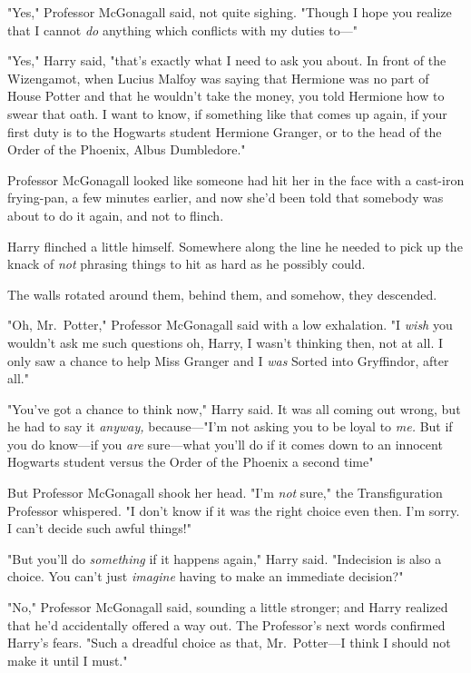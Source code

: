 "Yes," Professor McGonagall said, not quite sighing. "Though I hope you realize
that I cannot \emph{do} anything which conflicts with my duties to---"

"Yes," Harry said, "that's exactly what I need to ask you about. In front of
the Wizengamot, when Lucius Malfoy was saying that Hermione was no part of
House Potter and that he wouldn't take the money, you told Hermione how to
swear that oath. I want to know, if something like that comes up again, if your
first duty is to the Hogwarts student Hermione Granger, or to the head of the
Order of the Phoenix, Albus Dumbledore."

Professor McGonagall looked like someone had hit her in the face with a
cast-iron frying-pan, a few minutes earlier, and now she'd been told that
somebody was about to do it again, and not to flinch.

Harry flinched a little himself. Somewhere along the line he needed to pick up
the knack of \emph{not} phrasing things to hit as hard as he possibly could.

The walls rotated around them, behind them, and somehow, they descended.

"Oh, Mr.~Potter," Professor McGonagall said with a low exhalation. "I{\el}
\emph{wish} you wouldn't ask me such questions{\el} oh, Harry, I wasn't
thinking then, not at all. I only saw a chance to help Miss Granger and{\el}
I \emph{was} Sorted into Gryffindor, after all."

"You've got a chance to think now," Harry said. It was all coming out wrong,
but he had to say it \emph{anyway,} because---"I'm not asking you to be loyal
to \emph{me.} But if you do know---if you \emph{are} sure---what you'll do if
it comes down to an innocent Hogwarts student versus the Order of the Phoenix a
second time{\el}"

But Professor McGonagall shook her head. "I'm \emph{not} sure," the
Transfiguration Professor whispered. "I don't know if it was the right choice
even then. I'm sorry. I can't decide such awful things!"

"But you'll do \emph{something} if it happens again," Harry said. "Indecision
is also a choice. You can't just \emph{imagine} having to make an immediate
decision?"

"No," Professor McGonagall said, sounding a little stronger; and Harry realized
that he'd accidentally offered a way out. The Professor's next words confirmed
Harry's fears. "Such a dreadful choice as that, Mr.~Potter---I think I should
not make it until I must."

